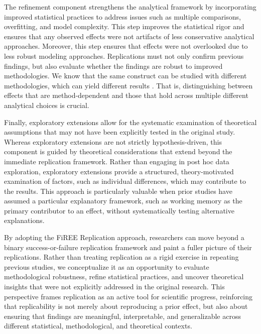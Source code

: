 The refinement component strengthens the analytical framework by incorporating improved statistical practices to address issues such as multiple comparisons, overfitting, and model complexity. This step improves the statistical rigor and ensures that any observed effects were not artifacts of less conservative analytical approaches. Moreover, this step ensures that effects were not overlooked due to less robust modeling approaches. Replications must not only confirm previous findings, but also evaluate whether the findings are robust to improved methodologies. We know that the same construct can be studied with different methodologies, which can yield different results \citep[e.g.,][] {roettger2017methodological}. That is, distinguishing between effects that are method-dependent and those that hold across multiple different analytical choices is crucial.

Finally, exploratory extensions allow for the systematic examination of theoretical assumptions that may not have been explicitly tested in the original study. Whereas exploratory extensions are not strictly hypothesis-driven, this component is guided by theoretical considerations that extend beyond the immediate replication framework. Rather than engaging in post hoc data exploration, exploratory extensions provide a structured, theory-motivated examination of factors, such as individual differences, which may contribute to the results. This approach is particularly valuable when prior studies have assumed a particular explanatory framework, such as working memory as the primary contributor to an effect, without systematically testing alternative explanations.

By adopting the FiREE Replication approach, researchers can move beyond a binary success-or-failure replication framework \citep{Nosek_Errington2020} and paint a fuller picture of their replications. Rather than treating replication as a rigid exercise in repeating previous studies, we conceptualize it as an opportunity to evaluate methodological robustness, refine statistical practices, and uncover theoretical insights that were not explicitly addressed in the original research. This perspective frames replication as an active tool for scientific progress, reinforcing that replicability is not merely about reproducing a prior effect, but also about ensuring that findings are meaningful, interpretable, and generalizable across different statistical, methodological, and theoretical contexts.


